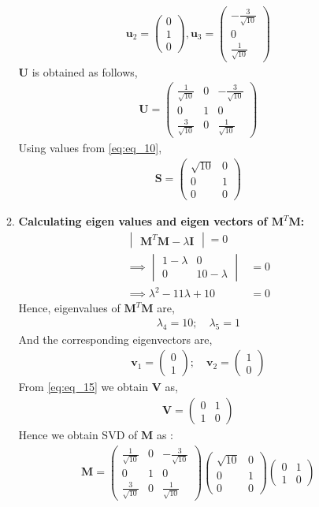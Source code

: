\documentclass[journal,12pt,twocolumn]{IEEEtran}
\let\vec\mathbf
\numberwithin{equation}{subsection}
\newcommand{\myvec}[1]{\ensuremath{\begin{pmatrix}#1\end{pmatrix}}}
\newcommand{\mydet}[1]{\ensuremath{\begin{vmatrix}#1\end{vmatrix}}}
\begin{document}
\begin{enumerate}
\begin{enumerate}
\begin{align}
\vec{u}_2=\myvec{0\\1\\0},
\vec{u}_3=\myvec{-\frac{3}{\sqrt{10}}\\0\\\frac{1}{\sqrt{10}}}
\end{align}
$\vec{U}$ is obtained as  follows,
\begin{align}
 \vec{U}=  \myvec{\frac{1}{\sqrt{10}}& 0&-\frac{3}{\sqrt{10}}\\
0&1&0\\
\frac{3}{\sqrt{10}}&0&\frac{1}{\sqrt{10}}}  \label{2.30}
\end{align}
Using values from \eqref{eq:eq_10},
\begin{align} \label{eq:eq_14}
    \vec{S} = \myvec{\sqrt{10} & 0 \\ 0 & 1 \\ 0 & 0} 
\end{align}
\item \textbf{Calculating eigen values and eigen vectors of  $\vec{M}^T\vec{M}$:}
\begin{align}
    \mydet{\vec{M}^T\vec{M} - \lambda \vec{I}} = 0 \nonumber \\
    \implies \mydet{1-\lambda & 0 \\ 0 & 10-\lambda} &= 0 \nonumber \\
    \implies \lambda^2 -11\lambda + 10 &= 0 \nonumber
\end{align}
Hence, eigenvalues of $\vec{M}^T\vec{M}$ are,
\begin{align}
    \lambda_4 =10; \quad \lambda_5 = 1 \nonumber
\end{align}
And the corresponding eigenvectors are,
\begin{align}
    \vec{v}_1 = \myvec{0 \\ 1}; \quad 
    \vec{v}_2 =  \myvec{1 \\ 0}\label{eq:eq_15}
\end{align}
From \eqref{eq:eq_15} we obtain $\vec{V}$ as,
\begin{align} \label{eq:eq_16}
    \vec{V} = \myvec{0 & 1 \\ 1 & 0}
\end{align}
Hence we obtain SVD of $\vec{M}$ as :
\begin{align}
	\vec{M}  =  \myvec{\frac{1}{\sqrt{10}}& 0&-\frac{3}{\sqrt{10}}\\
0&1&0\\ \frac{3}{\sqrt{10}}&0&\frac{1}{\sqrt{10}}}\myvec{\sqrt{10} & 0 \\ 0 & 1 \\ 0 & 0} \myvec{0 & 1 \\ 1 & 0}

\end{align}
\end{enumerate}
\end{enumerate}
\end{document}
